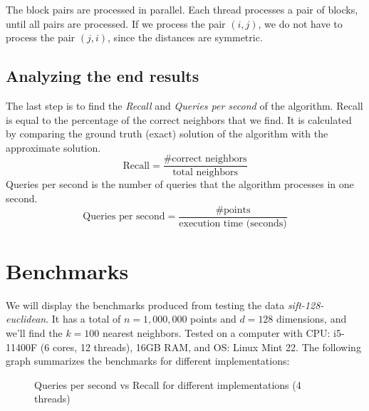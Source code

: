 \documentclass{article}
\begin{document}
The block pairs are processed in parallel. Each thread processes a pair of blocks, until all pairs are processed.
If we process the pair $(i, j)$, we do not have to process the pair $(j, i)$, since the distances are symmetric.

\subsection{Analyzing the end results}
The last step is to find the \emph{Recall} and \emph{Queries per second} of the algorithm. Recall is equal to the percentage of the
correct neighbors that we find. It is calculated by comparing the ground truth (exact) solution of the algorithm with the 
approximate solution.
\[
\text{Recall} = \frac{\text{\# correct neighbors}}{\text{total neighbors}}
\]
Queries per second is the number of queries that the algorithm processes in one second. 
\[
\text{Queries per second} = \frac{\text{\# points}}{\text{execution time (seconds)}}
\]


\section{Benchmarks}
We will display the benchmarks produced from testing the data \emph{sift-128-euclidean}.
It has a total of $n=1,000,000$ points and $d=128$ dimensions, and we'll find the $k=100$ nearest neighbors.
Tested on a computer with CPU: i5-11400F (6 cores, 12 threads), 16GB RAM, and OS: Linux Mint 22.
The following graph summarizes the benchmarks for different implementations:

\begin{figure}[H]
\centering
{}
\caption{Queries per second vs Recall for different implementations (4 threads)}
\end{figure}
\end{document}

